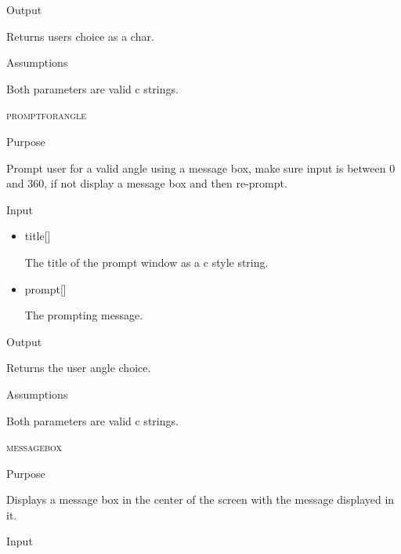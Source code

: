 \documentclass[pdftex, 11pt]{article}
\begin{document}
\begin{description}
\begin{description}
\begin{itemize}
				\end{itemize}

			\item{Output}

				Returns users choice as a char.

			\item{Assumptions}

				Both parameters are valid c strings.

		\end{description}


	\item{\textsc{promptforangle}}

		\begin{description}
			\item{Purpose}

				Prompt user for a valid angle using a message box, make sure input is between
				0 and 360, if not display a message box and then re-prompt.

			\item{Input}

				\begin{itemize}
					
					\item{title[]}

						The title of the prompt window as a c style string.

					\item{prompt[]}

						The prompting message.

				\end{itemize}

			\item{Output}

				Returns the user angle choice.

			\item{Assumptions}

				Both parameters are valid c strings.

		\end{description}


	\item{\textsc{messagebox}}
		\begin{description}
			\item{Purpose}

				Displays a message box in the center of the screen with
				the message displayed in it.

			\item{Input}


\end{description}
\end{description}
\end{document}
